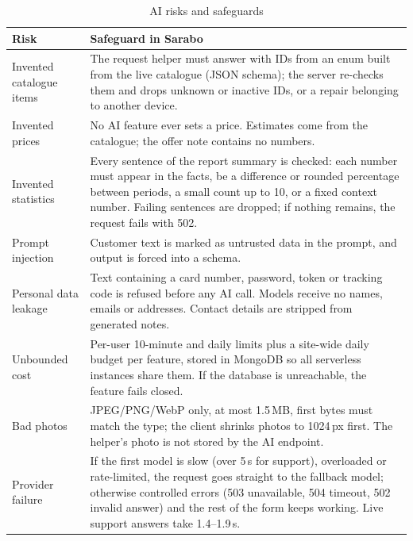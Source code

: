 \documentclass{standalone}
\begin{document}
\begin{table}[htbp]
\centering
\caption{AI risks and safeguards}
\label{tab:aisafety}
\small
\begin{tabularx}{\textwidth}{@{}p{3.4cm}X@{}}
\toprule
\textbf{Risk} & \textbf{Safeguard in Sarabo} \\
\midrule
Invented catalogue items & The request helper must answer with IDs from an enum built from the live catalogue (JSON schema); the server re-checks them and drops unknown or inactive IDs, or a repair belonging to another device. \\
Invented prices & No AI feature ever sets a price. Estimates come from the catalogue; the offer note contains no numbers. \\
Invented statistics & Every sentence of the report summary is checked: each number must appear in the facts, be a difference or rounded percentage between periods, a small count up to 10, or a fixed context number. Failing sentences are dropped; if nothing remains, the request fails with 502. \\
Prompt injection & Customer text is marked as untrusted data in the prompt, and output is forced into a schema. \\
Personal data leakage & Text containing a card number, password, token or tracking code is refused before any AI call. Models receive no names, emails or addresses. Contact details are stripped from generated notes. \\
Unbounded cost & Per-user 10-minute and daily limits plus a site-wide daily budget per feature, stored in MongoDB so all serverless instances share them. If the database is unreachable, the feature fails closed. \\
Bad photos & JPEG/PNG/WebP only, at most 1.5\,MB, first bytes must match the type; the client shrinks photos to 1024\,px first. The helper's photo is not stored by the AI endpoint. \\
Provider failure & If the first model is slow (over 5\,s for support), overloaded or rate-limited, the request goes straight to the fallback model; otherwise controlled errors (503 unavailable, 504 timeout, 502 invalid answer) and the rest of the form keeps working. Live support answers take 1.4--1.9\,s. \\
\bottomrule
\end{tabularx}
\end{table}
\end{document}
